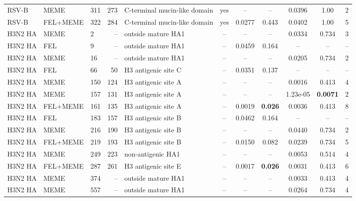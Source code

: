 \documentclass[11pt]{article}
\begin{document}
\begin{table}[H]
{\begin{tabular}{lllrlcccccc}
RSV-B & MEME & 311 & 273 & C-terminal mucin-like domain & yes & -- & -- & 0.0396 & 1.00 & 2 \\
RSV-B & FEL+MEME & 322 & 284 & C-terminal mucin-like domain & yes & 0.0277 & 0.443 & 0.0402 & 1.00 & 5 \\
H3N2 HA & MEME & 2 & -- & outside mature HA1 & -- & -- & -- & 0.0334 & 0.734 & 3 \\
H3N2 HA & FEL & 9 & -- & outside mature HA1 & -- & 0.0459 & 0.164 & -- & -- & -- \\
H3N2 HA & MEME & 16 & -- & outside mature HA1 & -- & -- & -- & 0.0205 & 0.734 & 2 \\
H3N2 HA & FEL & 66 & 50 & H3 antigenic site C & -- & 0.0351 & 0.137 & -- & -- & -- \\
H3N2 HA & MEME & 150 & 124 & H3 antigenic site A & -- & -- & -- & 0.0016 & 0.413 & 4 \\
H3N2 HA & MEME & 157 & 131 & H3 antigenic site A & -- & -- & -- & 1.23e-05 & \textbf{0.0071} & 2 \\
H3N2 HA & FEL+MEME & 161 & 135 & H3 antigenic site A & -- & 0.0019 & \textbf{0.026} & 0.0036 & 0.413 & 8 \\
H3N2 HA & FEL & 183 & 157 & H3 antigenic site B & -- & 0.0462 & 0.164 & -- & -- & -- \\
H3N2 HA & MEME & 216 & 190 & H3 antigenic site B & -- & -- & -- & 0.0440 & 0.734 & 2 \\
H3N2 HA & FEL+MEME & 219 & 193 & H3 antigenic site B & -- & 0.0150 & 0.082 & 0.0239 & 0.734 & 5 \\
H3N2 HA & MEME & 249 & 223 & non-antigenic HA1 & -- & -- & -- & 0.0053 & 0.514 & 4 \\
H3N2 HA & FEL+MEME & 287 & 261 & H3 antigenic site E & -- & 0.0017 & \textbf{0.026} & 0.0031 & 0.413 & 6 \\
H3N2 HA & MEME & 374 & -- & outside mature HA1 & -- & -- & -- & 0.0033 & 0.413 & 4 \\
H3N2 HA & MEME & 557 & -- & outside mature HA1 & -- & -- & -- & 0.0264 & 0.734 & 4 \\
\bottomrule
\end{tabular}%
}
\end{table}
\end{document}
